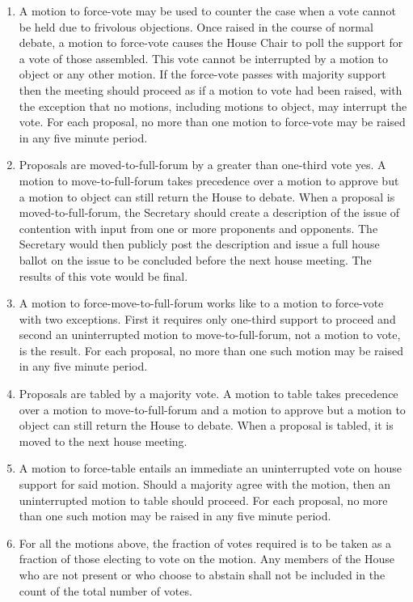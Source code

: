 \documentclass[letterpaper]{article}
\begin{document}
\begin{enumerate}
\begin{enumerate}
\begin{enumerate}
\item A motion to force-vote may be used to counter the case when a vote cannot be held due to frivolous objections. Once raised in the course of normal debate, a motion to force-vote causes the House Chair to poll the support for a vote of those assembled. This vote cannot be interrupted by a motion to object or any other motion. If the force-vote passes with majority support then the meeting should proceed as if a motion to vote had been raised, with the exception that no motions, including motions to object, may interrupt the vote. For each proposal, no more than one motion to force-vote may be raised in any five minute period.

\item Proposals are moved-to-full-forum by a greater than one-third vote yes. A motion to move-to-full-forum takes precedence over a motion to approve but a motion to object can still return the House to debate. When a proposal is moved-to-full-forum, the Secretary should create a description of the issue of contention with input from one or more proponents and opponents. The Secretary would then publicly post the description and issue a full house ballot on the issue to be concluded before the next house meeting. The results of this vote would be final.

\item A motion to force-move-to-full-forum works like to a motion to force-vote with two exceptions. First it requires only one-third support to proceed and second an uninterrupted motion to move-to-full-forum, not a motion to vote, is the result. For each proposal, no more than one such motion may be raised in any five minute period.

\item Proposals are tabled by a majority vote. A motion to table takes precedence over a motion to move-to-full-forum and a motion to approve but a motion to object can still return the House to debate. When a proposal is tabled, it is moved to the next house meeting.

\item A motion to force-table entails an immediate an uninterrupted vote on house support for said motion. Should a majority agree with the motion, then an uninterrupted motion to table should proceed. For each proposal, no more than one such motion may be raised in any five minute period.

\item For all the motions above, the fraction of votes required is to be taken as a fraction of those electing to vote on the motion. Any members of the House who are not present or who choose to abstain shall not be included in the count of the total number of votes.


\end{enumerate}
\end{enumerate}
\end{enumerate}
\end{document}
